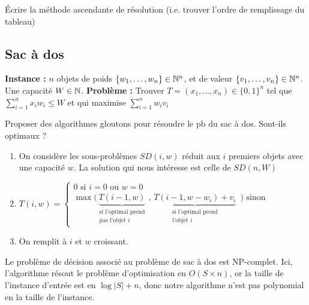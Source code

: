 \begin{exercise}
	Écrire la méthode ascendante de résolution (i.e. trouver l'ordre de remplissage du tableau)
\end{exercise}

\subsection{Sac à dos}

\textbf{Instance :} $n$ objets de poids $\{w_1, \dots, w_n\} \in \mathbb{N}^n$, et de valeur $\{v_1, \dots, v_n\}\in \mathbb{N}^n$. Une capacité $W \in \mathbb{N}$.
\textbf{Problème :} Trouver $T = (x_1, \dots, x_n) \in \{0, 1\}^n$ tel que $\sum\limits_{i = 1}^n x_iw_i \leq W$ et qui maximise $\sum\limits_{i=1}^n w_iv_i$

\begin{exercise}
	Proposer des algorithmes gloutons pour résoudre le pb du sac à dos. Sont-ils optimaux ?
\end{exercise}

\begin{algo}
	\enspace
	\begin{enumerate}
		\item On considère les sous-problèmes $SD(i,w)$ réduit aux $i$ premiers objets avec une capacité $w$. La solution qui nous intéresse est celle de $SD(n, W)$
		\item $T(i, w)= \left\{ \begin{array}{l}
			0 \text{ si } i = 0 \text{ ou } w = 0\\
			\max\Big( \underset{\substack{\text{si l'optimal prend}\\\text{pas l'objet }i}}{\underbrace{T(i-1, w)}} \,,\, \underset{\substack{\text{si l'optimal prend}\\\text{l'objet }i}}{\underbrace{T(i-1, w-w_i) + v_i}} \enspace \Big) \text{ sinon}
		\end{array} \right.$
		\item On remplit à $i$ et $w$ croissant.
	\end{enumerate}
\end{algo}

\begin{rem}
	Le problème de décision associé au problème de sac à dos est NP-complet. Ici, l'algorithme résout le problème d'optimisation en $O(S\times n)$, or la taille de l'instance d'entrée est en $\log|S| + n$, donc notre algorithme n'est pas polynomial en la taille de l'instance.
\end{rem}

